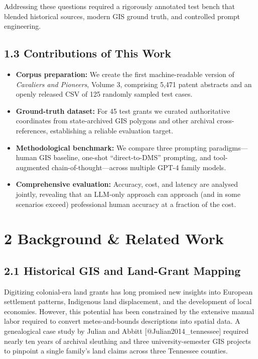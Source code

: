 \documentclass[
  11pt,
]{article}
\providecommand{\tightlist}{%
  \setlength{\itemsep}{0pt}\setlength{\parskip}{0pt}}
\begin{document}
Addressing these questions required a rigorously annotated test bench
that blended historical sources, modern GIS ground truth, and controlled
prompt engineering.

\subsection{1.3 Contributions of This
Work}\label{contributions-of-this-work}

\begin{itemize}
\tightlist
\item
  \textbf{Corpus preparation:} We create the first machine-readable
  version of \emph{Cavaliers and Pioneers}, Volume 3, comprising 5,471
  patent abstracts and an openly released CSV of 125 randomly sampled
  test cases.
\item
  \textbf{Ground-truth dataset:} For 45 test grants we curated
  authoritative coordinates from state-archived GIS polygons and other
  archival cross-references, establishing a reliable evaluation target.
\item
  \textbf{Methodological benchmark:} We compare three prompting
  paradigms---human GIS baseline, one-shot ``direct-to-DMS'' prompting,
  and tool-augmented chain-of-thought---across multiple GPT-4 family
  models.
\item
  \textbf{Comprehensive evaluation:} Accuracy, cost, and latency are
  analysed jointly, revealing that an LLM-only approach can approach
  (and in some scenarios exceed) professional human accuracy at a
  fraction of the cost.
\end{itemize}

\section{2 Background \& Related Work}\label{background-related-work}

\subsection{2.1 Historical GIS and Land-Grant
Mapping}\label{historical-gis-and-land-grant-mapping}

Digitizing colonial-era land grants has long promised new insights into
European settlement patterns, Indigenous land displacement, and the
development of local economies. However, this potential has been
constrained by the extensive manual labor required to convert
metes-and-bounds descriptions into spatial data. A genealogical case
study by Julian and Abbitt {[}@Julian2014\_tennessee{]} required nearly
ten years of archival sleuthing and three university-semester GIS
projects to pinpoint a single family's land claims across three
Tennessee counties.
\end{document}
